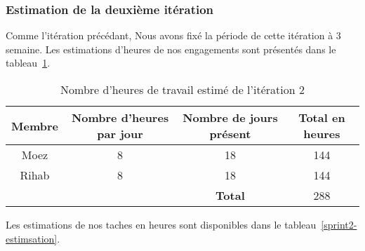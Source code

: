 \subsubsection{Estimation de la deuxième itération}

Comme l'itération précédant, Nous avons fixé la période de cette itération à 3
semaine. Les estimations d'heures de nos engagements sont présentés dans le
tableau~\ref{tab:sprint2-capacity}.

\begin{table}[htbp]
    \centering
    \begin{tabular}{| c | c | c | c |}
        \hline
        \textbf{Membre} & \textbf{Nombre d'heures par jour} & \textbf{Nombre de jours présent} & \textbf{Total en heures} \\ \hline
        \hline
Moez & 8 & 18& 144\\ \hline
Rihab & 8 & 18 & 144 \\ \hline
\multicolumn{2}{c|}{} & \textbf{Total} & 288 \\ \cline{3-4}
    \end{tabular}
    \caption{Nombre d'heures de travail estimé de l'itération 2}
    \label{tab:sprint2-capacity}
\end{table}

Les estimations de nos taches en heures sont disponibles dans le
tableau~\ref{sprint2-estimsation}.

